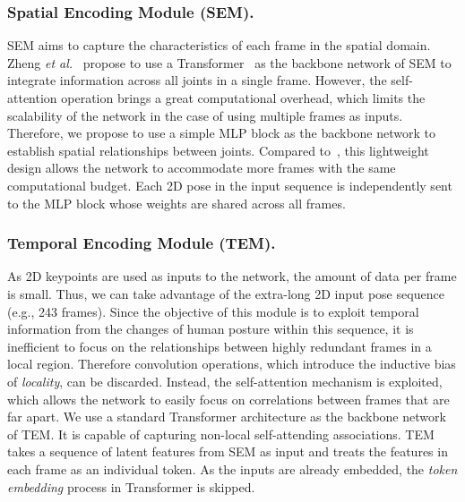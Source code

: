 \documentclass[]{llncs}
\begin{document}
\subsubsection{Spatial Encoding Module (SEM).}
SEM aims to capture the characteristics of each frame in the spatial domain. Zheng \textit{et al.}~\cite{zheng20213d} propose to use a Transformer~\cite{vaswani2017attention} as the backbone network of SEM to integrate information across all joints in a single frame. However, the self-attention operation brings a great computational overhead, which limits the scalability of the network in the case of using multiple frames as inputs. Therefore, we propose to use a simple MLP block as the backbone network to establish spatial relationships between joints. Compared to~\cite{zheng20213d}, this lightweight design allows the network to accommodate more frames with the same computational budget. Each 2D pose in the input sequence is independently sent to the MLP block whose weights are shared across all frames.


\subsubsection{Temporal Encoding Module (TEM).}
As 2D keypoints are used as inputs to the network, the amount of data per frame is small. Thus, we can take advantage of the extra-long 2D input pose sequence (e.g., 243 frames). Since the objective of this module is to exploit temporal information from the changes of human posture within this sequence, it is inefficient to focus on the relationships between highly redundant frames in a local region. Therefore convolution operations, which introduce the inductive bias of \emph{locality}, can be discarded. Instead, the self-attention mechanism is exploited, which allows the network to easily focus on correlations between frames that are far apart. We use a standard Transformer architecture as the backbone network of TEM. It is capable of capturing non-local self-attending associations. TEM takes a sequence of latent features from SEM as input and treats the features in each frame as an individual token. As the inputs are already embedded, the \emph{token embedding} process in Transformer is skipped.
\end{document}
